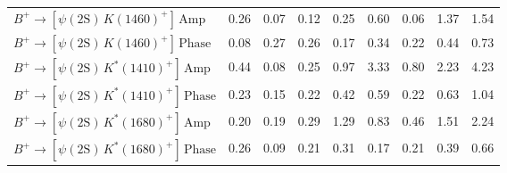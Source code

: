 \begin{tabular}{l  c  c  c  c  c  c  c  | c }
$B^{+}\rightarrow \left[\psi(\text{2S})\,K(1460)^{+}\right]\,\text{Amp}$ & 0.26 & 0.07 & 0.12 & 0.25 & 0.60 & 0.06 & 1.37 & 1.54 \\ 
$B^{+}\rightarrow \left[\psi(\text{2S})\,K(1460)^{+}\right]\,\text{Phase}$ & 0.08 & 0.27 & 0.26 & 0.17 & 0.34 & 0.22 & 0.44 & 0.73 \\ 
$B^{+}\rightarrow \left[\psi(\text{2S})\,K^{*}(1410)^{+}\right]\,\text{Amp}$ & 0.44 & 0.08 & 0.25 & 0.97 & 3.33 & 0.80 & 2.23 & 4.23 \\ 
$B^{+}\rightarrow \left[\psi(\text{2S})\,K^{*}(1410)^{+}\right]\,\text{Phase}$ & 0.23 & 0.15 & 0.22 & 0.42 & 0.59 & 0.22 & 0.63 & 1.04 \\ 
$B^{+}\rightarrow \left[\psi(\text{2S})\,K^{*}(1680)^{+}\right]\,\text{Amp}$ & 0.20 & 0.19 & 0.29 & 1.29 & 0.83 & 0.46 & 1.51 & 2.24 \\ 
$B^{+}\rightarrow \left[\psi(\text{2S})\,K^{*}(1680)^{+}\right]\,\text{Phase}$ & 0.26 & 0.09 & 0.21 & 0.31 & 0.17 & 0.21 & 0.39 & 0.66 \\ 
\hline
\hline
\end{tabular}
